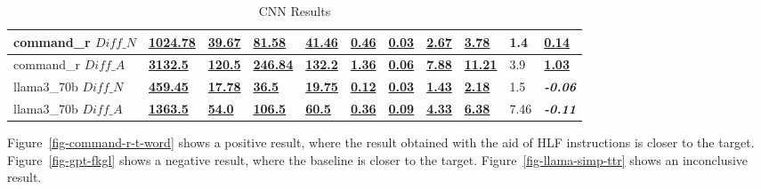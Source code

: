 \documentclass[11pt]{article}
\begin{document}
\begin{table}[htp]
{\begin{tabular}{lllllllllll}
            command\_r $Diff\_N$  & \textbf{\underline{1024.78}} & \textbf{\underline{39.67}} & \textbf{\underline{81.58}}  & \textbf{\underline{41.46}} & \textbf{\underline{0.46}} & \textbf{\underline{0.03}} & \textbf{\underline{2.67}} & \textbf{\underline{3.78}}  & 1.4                     & \textbf{\underline{0.14}} \\ \midrule
            command\_r $Diff\_A$  & \textbf{\underline{3132.5}}  & \textbf{\underline{120.5}} & \textbf{\underline{246.84}} & \textbf{\underline{132.2}} & \textbf{\underline{1.36}} & \textbf{\underline{0.06}} & \textbf{\underline{7.88}} & \textbf{\underline{11.21}} & 3.9                     & \textbf{\underline{1.03}} \\ \midrule
            llama3\_70b $Diff\_N$ & \textbf{\underline{459.45}}  & \textbf{\underline{17.78}} & \textbf{\underline{36.5}}   & \textbf{\underline{19.75}} & \textbf{\underline{0.12}} & \textbf{\underline{0.03}} & \textbf{\underline{1.43}} & \textbf{\underline{2.18}}  & 1.5                     & \textbf{\textit{-0.06}}   \\ \midrule
            llama3\_70b $Diff\_A$ & \textbf{\underline{1363.5}}  & \textbf{\underline{54.0}}  & \textbf{\underline{106.5}}  & \textbf{\underline{60.5}}  & \textbf{\underline{0.36}} & \textbf{\underline{0.09}} & \textbf{\underline{4.33}} & \textbf{\underline{6.38}}  & 7.46                    & \textbf{\textit{-0.11}}   \\ \bottomrule
        \end{tabular}%
    }\caption{CNN Results}\label{table-prompt-1-cnn-dailymail}
\end{table}

Figure~\ref{fig-command-r-t-word} shows a positive result, where the result
obtained with the aid of HLF instructions is closer to the target.
Figure~\ref{fig-gpt-fkgl} shows a negative result, where the baseline is closer
to the target.
Figure~\ref{fig-llama-simp-ttr} shows an inconclusive result.
\end{document}
